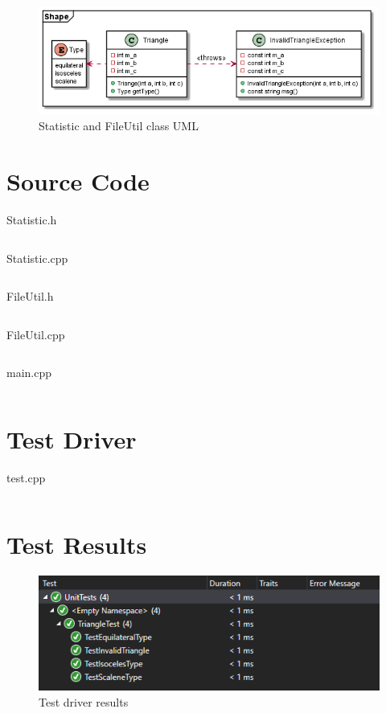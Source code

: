 \documentclass[letterpaper]{article}
\begin{document}
\begin{figure}[H]
    \centering
    \includegraphics[scale=0.7]{figures/classdiagram.png}
    \caption{Statistic and FileUtil class UML}
    \label{fig:classdiagram}
\end{figure}


\newpage
\section{Source Code}
\begin{code}
\caption{Statistic.h}
\inputminted[breaklines, frame=single, linenos]{cpp}{code/Statistic.h}
\label{code:statistic.h}
\end{code}

\begin{code}
\caption{Statistic.cpp}
\inputminted[breaklines, frame=single, linenos]{cpp}{code/Statistic.cpp}
\label{code:statistic.cpp}
\end{code}

\begin{code}
\caption{FileUtil.h}
\inputminted[breaklines, frame=single, linenos]{cpp}{code/FileUtil.h}
\label{code:fileutil.h}
\end{code}

\begin{code}
\caption{FileUtil.cpp}
\inputminted[breaklines, frame=single, linenos]{cpp}{code/FileUtil.cpp}
\label{code:FileUtil.cpp}
\end{code}

\begin{code}
\caption{main.cpp}
\inputminted[breaklines, frame=single, linenos]{cpp}{code/main.cpp}
\label{code:main.cpp}
\end{code}


\newpage
\section{Test Driver}
\begin{code}
\caption{test.cpp}
\inputminted[breaklines, frame=single, linenos]{cpp}{code/test.cpp}
\label{code:test.cpp}
\end{code}

\section{Test Results}
\begin{figure}[H]
    \centering
    \includegraphics[scale=.8]{figures/TestResults.PNG}
    \caption{Test driver results}
    \label{fig:testresults}
\end{figure}
\end{document}
